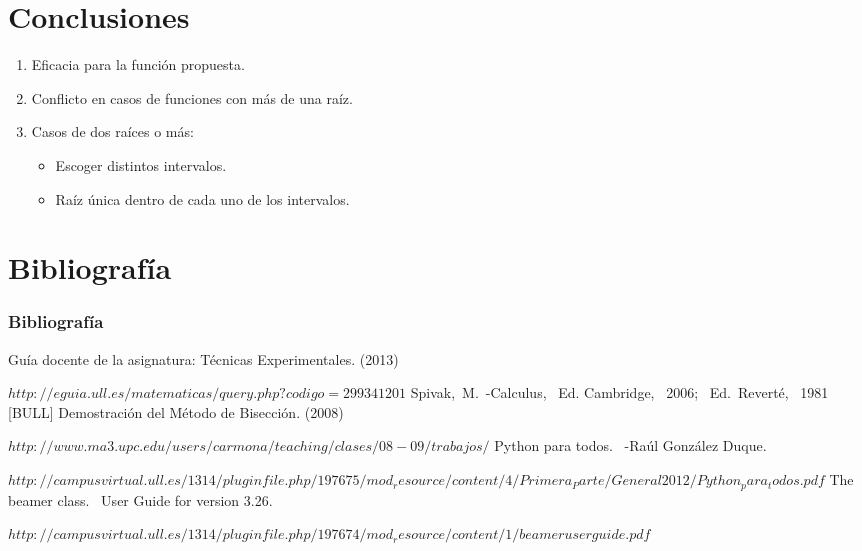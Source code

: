 \documentclass{beamer}
\begin{document}
\section{Conclusiones}
\begin{frame}
\begin{center}
\begin{enumerate}
\item {\LARGE Eficacia para la función propuesta.}\pause

\item {\LARGE Conflicto en casos de funciones con más de una raíz.}\pause

\item {\LARGE Casos de dos raíces o más:}\pause

\begin{itemize}
\item Escoger distintos intervalos.\pause
\item Raíz única dentro de cada uno de los intervalos.
\end{itemize}
\end{enumerate}
\end{center}
\end{frame}
\section{Bibliografía}
\begin{frame}
  \frametitle{Bibliografía}

  \begin{thebibliography}{10}
    Gu\'ia docente de la asignatura: T\'ecnicas Experimentales.
    (2013)
    
    {\tiny $http://eguia.ull.es/matematicas/query.php?codigo=299341201$}
    Spivak,~M.~-Calculus,~ Ed. Cambridge,~ 2006;~ Ed.~Revert\'e,~ 1981~ [BULL]
  Demostraci\'on del M\'etodo de Bisecci\'on.
  (2008)
  
  {\tiny $http://www.ma3.upc.edu/users/carmona/teaching/clases/08-09/trabajos/$}
  Python para todos. ~-Ra\'ul Gonz\'alez Duque.
  
  {\tiny $http://campusvirtual.ull.es/1314/pluginfile.php/197675/mod_resource/content/4/Primera_Parte/General2012/Python_para_todos.pdf$}
  The beamer class. ~User Guide for version 3.26.
  
  {\tiny $http://campusvirtual.ull.es/1314/pluginfile.php/197674/mod_resource/content/1/beameruserguide.pdf$}
  \end{thebibliography}
\end{frame}
\end{document}
